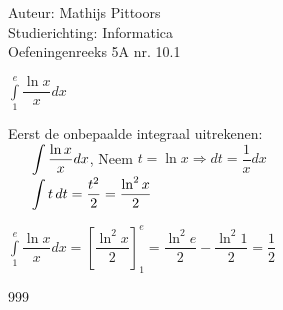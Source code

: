 \documentclass[a4paper]{article}
\newcommand{\bepint}{\displaystyle\int\limits}
\newcommand{\onbint}{\displaystyle\int}
\begin{document}
  
\noindent \large Auteur: Mathijs Pittoors \\
\noindent \large Studierichting: Informatica\\
\noindent \large Oefeningenreeks 5A nr. 10.1\\

\medskip

\normalsize

$\bepint_1^e \dfrac{\ln x}{x} dx$\\

\medskip

Eerst de onbepaalde integraal uitrekenen:\\

$\indent \onbint \dfrac{\ln x}{x} dx$, Neem $t = \ln x \Rightarrow dt = \dfrac{1}{x} dx$\\

$\indent \onbint t \, dt = \dfrac{t^2}{2} = \dfrac{\ln^2 x}{2}$\\

\medskip

$\bepint_1^e \dfrac{\ln x}{x} dx = \left[\dfrac{\ln^2 x}{2}\right]^e_1 = \dfrac{\ln^2 e}{2} - \dfrac{\ln^2 1}{2} = \dfrac{1}{2}$


\begin{thebibliography}{999}
\end{thebibliography}
\end{document}
